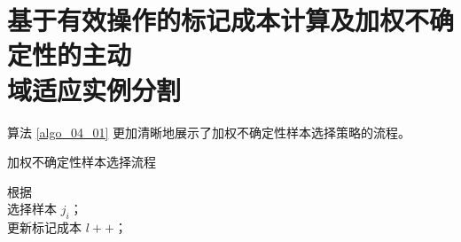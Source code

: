 \chapter[基于有效操作的标记成本计算及加权不确定性的主动域适应实例分割]{基于有效操作的标记成本计算及加权不确定性的主动\\域适应实例分割}
\label{cha:chap5}

算法 \ref{algo_04_01} 更加清晰地展示了加权不确定性样本选择策略的流程。
\begin{algorithm} 
    \small
    \caption{加权不确定性样本选择流程}  
    \label{algo_04_01}

     {
       {根据\\}
    }
     {
         {
            {选择样本 $j_{i}$；\\}
            {更新标记成本 $l++$；\\}
        }
    }  
\end{algorithm} 
